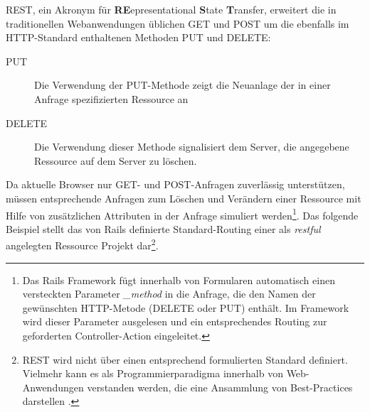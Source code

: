 REST, ein Akronym für \textbf{RE}epresentational \textbf{S}tate \textbf{T}ransfer, erweitert die in  traditionellen Webanwendungen üblichen GET und POST um die ebenfalls im HTTP-Standard enthaltenen Methoden PUT und DELETE:

\begin{description}
\item[PUT]
	Die Verwendung der PUT-Methode zeigt die Neuanlage der in einer	Anfrage spezifizierten Ressource an
\item[DELETE]
	Die Verwendung dieser Methode signalisiert dem Server, die angegebene Ressource auf dem Server zu löschen.
\end{description}
Da aktuelle Browser nur GET- und POST-Anfragen zuverlässig unterstützen, müssen entsprechende Anfragen zum Löschen und Verändern einer Ressource mit Hilfe von zusätzlichen Attributen in der Anfrage simuliert werden\footnote{Das Rails Framework fügt  innerhalb von Formularen automatisch einen versteckten Parameter \emph{\_method} in die Anfrage, die den Namen der gewünschten HTTP-Metode (DELETE oder PUT) enthält. Im Framework wird dieser Parameter ausgelesen und ein entsprechendes Routing zur geforderten Controller-Action eingeleitet.}. Das folgende Beispiel stellt das von Rails definierte Standard-Routing einer als \emph{restful} angelegten Ressource Projekt dar\footnote{REST wird nicht über einen entsprechend formulierten Standard definiert. Vielmehr kann es als Programmierparadigma innerhalb von Web-Anwendungen verstanden werden, die eine Ansammlung von Best-Practices darstellen \cite{restful}.}.

